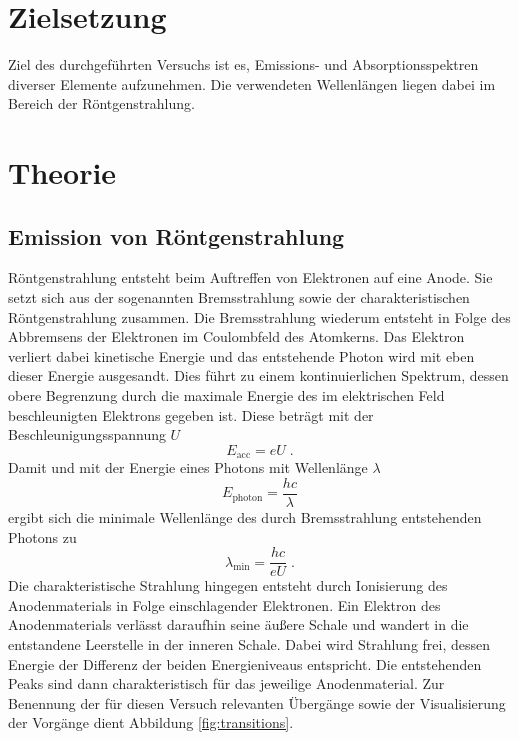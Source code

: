 \section{Zielsetzung}
Ziel des durchgeführten Versuchs ist es, Emissions- und Absorptionsspektren diverser Elemente aufzunehmen. Die verwendeten Wellenlängen liegen dabei im Bereich der Röntgenstrahlung.

\section{Theorie}
\label{sec:Theorie}
\subsection{Emission von Röntgenstrahlung}
Röntgenstrahlung entsteht beim Auftreffen von Elektronen auf eine Anode. Sie setzt sich aus der sogenannten Bremsstrahlung sowie der charakteristischen Röntgenstrahlung zusammen. Die Bremsstrahlung wiederum entsteht in Folge des Abbremsens der Elektronen im Coulombfeld des Atomkerns. Das Elektron verliert dabei kinetische Energie und das entstehende Photon wird mit eben dieser Energie ausgesandt. Dies führt zu einem kontinuierlichen Spektrum, dessen obere Begrenzung durch die maximale Energie des im elektrischen Feld beschleunigten Elektrons gegeben ist. Diese beträgt mit der Beschleunigungsspannung $U$
\begin{equation*}
  E_\text{acc} = eU \; .
\end{equation*}
Damit und mit der Energie eines Photons mit Wellenlänge $\lambda$
\begin{equation}
  E_\text{photon} = \frac{hc}{\lambda}
  \label{eq:Ephoton}
\end{equation}
ergibt sich die minimale Wellenlänge des durch Bremsstrahlung entstehenden Photons zu
\begin{equation}
  \label{eq:lambdamin}
  \lambda_\text{min} = \frac{hc}{eU} \; .
\end{equation}
Die charakteristische Strahlung hingegen entsteht durch Ionisierung des Anodenmaterials in Folge einschlagender Elektronen. Ein Elektron des Anodenmaterials verlässt daraufhin seine äußere Schale und wandert in die entstandene Leerstelle in der inneren Schale. Dabei wird Strahlung frei, dessen Energie der Differenz der beiden Energieniveaus entspricht. Die entstehenden Peaks sind dann charakteristisch für das jeweilige Anodenmaterial. Zur Benennung der für diesen Versuch relevanten Übergänge sowie der Visualisierung der Vorgänge dient Abbildung \ref{fig:transitions}.
